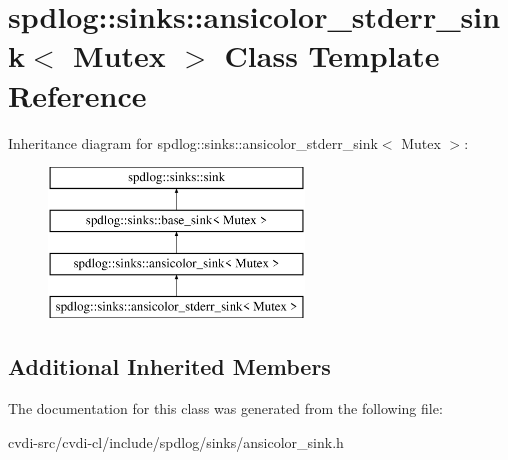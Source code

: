 \hypertarget{classspdlog_1_1sinks_1_1ansicolor__stderr__sink}{}\section{spdlog\+:\+:sinks\+:\+:ansicolor\+\_\+stderr\+\_\+sink$<$ Mutex $>$ Class Template Reference}
\label{classspdlog_1_1sinks_1_1ansicolor__stderr__sink}
Inheritance diagram for spdlog\+:\+:sinks\+:\+:ansicolor\+\_\+stderr\+\_\+sink$<$ Mutex $>$\+:\begin{figure}[H]
\begin{center}
\leavevmode
\includegraphics[height=4.000000cm]{classspdlog_1_1sinks_1_1ansicolor__stderr__sink}
\end{center}
\end{figure}
\subsection*{Additional Inherited Members}


The documentation for this class was generated from the following file\+:\begin{DoxyCompactItemize}
\item 
cvdi-\/src/cvdi-\/cl/include/spdlog/sinks/ansicolor\+\_\+sink.\+h\end{DoxyCompactItemize}
